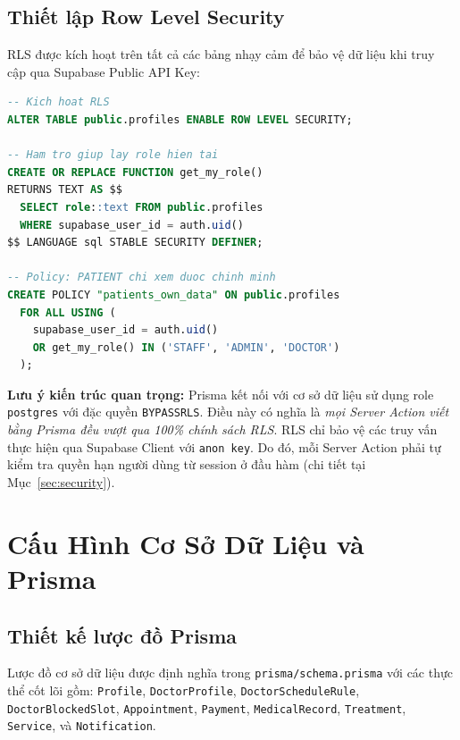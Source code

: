 \documentclass[14pt,a4paper]{report}
\begin{document}
\subsection{Thiết lập Row Level Security}

RLS được kích hoạt trên tất cả các bảng nhạy cảm để bảo vệ dữ liệu
khi truy cập qua Supabase Public API Key:

\begin{lstlisting}[language=SQL, caption={Kích hoạt RLS và tạo policy cho bảng profiles}]
-- Kich hoat RLS
ALTER TABLE public.profiles ENABLE ROW LEVEL SECURITY;

-- Ham tro giup lay role hien tai
CREATE OR REPLACE FUNCTION get_my_role()
RETURNS TEXT AS $$
  SELECT role::text FROM public.profiles
  WHERE supabase_user_id = auth.uid()
$$ LANGUAGE sql STABLE SECURITY DEFINER;

-- Policy: PATIENT chi xem duoc chinh minh
CREATE POLICY "patients_own_data" ON public.profiles
  FOR ALL USING (
    supabase_user_id = auth.uid()
    OR get_my_role() IN ('STAFF', 'ADMIN', 'DOCTOR')
  );
\end{lstlisting}

\textbf{Lưu ý kiến trúc quan trọng:} Prisma kết nối với cơ sở dữ
liệu sử dụng role \texttt{postgres} với đặc quyền
\texttt{BYPASSRLS}. Điều này có nghĩa là \textit{mọi Server Action
viết bằng Prisma đều vượt qua 100\% chính sách RLS}. RLS chỉ bảo
vệ các truy vấn thực hiện qua Supabase Client với \texttt{anon key}.
Do đó, mỗi Server Action phải tự kiểm tra quyền hạn người dùng từ
session ở đầu hàm (chi tiết tại Mục~\ref{sec:security}).

\section{Cấu Hình Cơ Sở Dữ Liệu và Prisma}

\subsection{Thiết kế lược đồ Prisma}

Lược đồ cơ sở dữ liệu được định nghĩa trong \texttt{prisma/schema.prisma}
với các thực thể cốt lõi gồm: \texttt{Profile}, \texttt{DoctorProfile},
\texttt{DoctorScheduleRule}, \texttt{DoctorBlockedSlot},
\texttt{Appointment}, \texttt{Payment}, \texttt{MedicalRecord},
\texttt{Treatment}, \texttt{Service}, và \texttt{Notification}.
\end{document}
